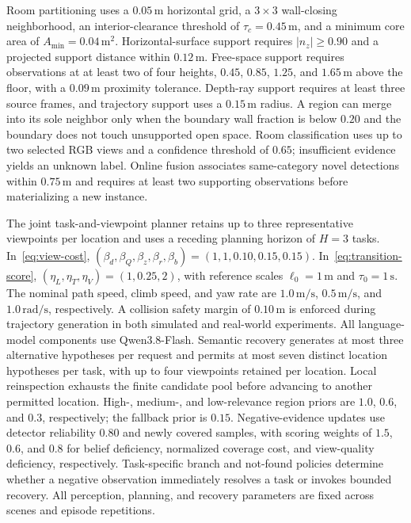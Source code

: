 \documentclass[letterpaper,10pt,journal]{IEEEtran}
\begin{document}
Room partitioning uses a $0.05\,\mathrm{m}$ horizontal grid, a $3\times3$ wall-closing neighborhood, an interior-clearance threshold of $\tau_c=0.45\,\mathrm{m}$, and a minimum core area of $A_{\min}=0.04\,\mathrm{m}^2$. Horizontal-surface support requires $|n_z|\geq0.90$ and a projected support distance within $0.12\,\mathrm{m}$. Free-space support requires observations at at least two of four heights, $0.45$, $0.85$, $1.25$, and $1.65\,\mathrm{m}$ above the floor, with a $0.09\,\mathrm{m}$ proximity tolerance. Depth-ray support requires at least three source frames, and trajectory support uses a $0.15\,\mathrm{m}$ radius. A region can merge into its sole neighbor only when the boundary wall fraction is below $0.20$ and the boundary does not touch unsupported open space. Room classification uses up to two selected RGB views and a confidence threshold of $0.65$; insufficient evidence yields an unknown label. Online fusion associates same-category novel detections within $0.75\,\mathrm{m}$ and requires at least two supporting observations before materializing a new instance.

The joint task-and-viewpoint planner retains up to three representative viewpoints per location and uses a receding planning horizon of $H=3$ tasks. In~\eqref{eq:view-cost}, $(\beta_d,\beta_Q,\beta_z,\beta_r,\beta_b)=(1,1,0.10,0.15,0.15)$. In~\eqref{eq:transition-score}, $(\eta_L,\eta_T,\eta_V)=(1,0.25,2)$, with reference scales $\ell_0=1\,\mathrm{m}$ and $\tau_0=1\,\mathrm{s}$. The nominal path speed, climb speed, and yaw rate are $1.0\,\mathrm{m/s}$, $0.5\,\mathrm{m/s}$, and $1.0\,\mathrm{rad/s}$, respectively. A collision safety margin of $0.10\,\mathrm{m}$ is enforced during trajectory generation in both simulated and real-world experiments. All language-model components use Qwen3.8-Flash. Semantic recovery generates at most three alternative hypotheses per request and permits at most seven distinct location hypotheses per task, with up to four viewpoints retained per location. Local reinspection exhausts the finite candidate pool before advancing to another permitted location. High-, medium-, and low-relevance region priors are $1.0$, $0.6$, and $0.3$, respectively; the fallback prior is $0.15$. Negative-evidence updates use detector reliability $0.80$ and newly covered samples, with scoring weights of $1.5$, $0.6$, and $0.8$ for belief deficiency, normalized coverage cost, and view-quality deficiency, respectively. Task-specific branch and not-found policies determine whether a negative observation immediately resolves a task or invokes bounded recovery. All perception, planning, and recovery parameters are fixed across scenes and episode repetitions.
\end{document}
